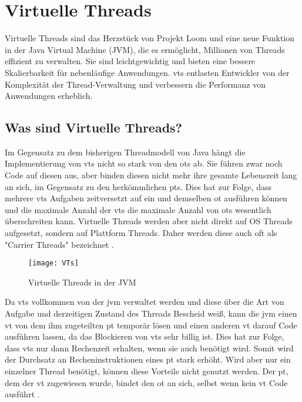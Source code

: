 \section{Virtuelle Threads}                                 %
\label{sec:VirtuelleThreads}

Virtuelle Threads sind das Herzstück von Projekt Loom und eine neue Funktion in der Java Virtual Machine (JVM), die es ermöglicht, Millionen von Threads effizient zu verwalten.
Sie sind leichtgewichtig und bieten eine bessere Skalierbarkeit für nebenläufige Anwendungen.
\Glspl{vt} entlasten Entwickler von der Komplexität der Thread-Verwaltung und verbessern die Performanz von Anwendungen erheblich.


\subsection{Was sind Virtuelle Threads?}
\label{subsec:WassindVTs?}

    Im Gegensatz zu dem bisherigen Threadmodell von Java hängt die Implementierung von \Glspl{vt} nicht so stark von den \Glspl{ot} ab. Sie führen zwar noch Code 
    auf diesen aus, aber binden diesen nicht mehr ihre gesamte Lebenszeit lang an sich, im Gegensatz zu den herkömmlichen \Glspl{pt}. Dies hat zur Folge, 
    dass mehrere \Glspl{vt} Aufgaben zeitversetzt auf ein und demselben \gls{ot} ausführen können und die maximale Anzahl der \Glspl{vt}
    die maximale Anzahl von \Glspl{ot} wesentlich überschreiten kann.
    Virtuelle Threads werden aber nicht direkt auf OS Threads aufgesetzt, sondern auf Plattform Threads.
    Daher werden diese auch oft als "Carrier Threads" bezeichnet \cite{ieee2022}.
    

    \begin{figure}[H]
        \centering
        \texttt{[image: VTs]}
        \caption{Virtuelle Threads in der JVM}
        \label{fig:VTs}
    \end{figure}

    Da \Glspl{vt} vollkommen von der \gls{jvm} verwaltet werden und diese über die Art von Aufgabe und derzeitigen Zustand des Threads Bescheid weiß, kann die
    \gls{jvm} einen \gls{vt} von dem ihm zugeteilten \gls{pt} temporär lösen und einen anderen \gls{vt} darauf Code ausführen lassen, da das Blockieren von \Glspl{vt}
    sehr billig ist. Dies hat zur Folge, dass \Glspl{vt} nur dann Rechenzeit erhalten, wenn sie auch benötigt wird. Somit wird der Durchsatz an Recheninstruktionen
    eines \gls{pt} stark erhöht.
    Wird aber nur ein einzelner Thread benötigt, können diese Vorteile nicht genutzt werden. Der \gls{pt}, dem der \gls{vt} zugewiesen wurde, bindet den \gls{ot}
    an sich, selbst wenn kein \gls{vt} Code ausführt \cite{JEP444}.
    

